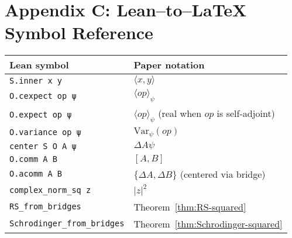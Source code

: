 \documentclass[11pt]{article}
\newcommand{\ip}[2]{\langle #1, #2 \rangle}
\newcommand{\E}[1]{\langle #1 \rangle}
\newcommand{\comm}[2]{[#1, #2]}
\newcommand{\acomm}[2]{\{#1, #2\}} %
\newcommand{\absC}[1]{\left| #1 \right|}
\newcommand{\Var}{\mathrm{Var}}
\theoremstyle{plain}
\theoremstyle{definition}
\theoremstyle{remark}
\begin{document}
\section*{Appendix C: Lean--to--LaTeX Symbol Reference}

\begin{center}
\begin{tabular}{ll}
\toprule
\textbf{Lean symbol} & \textbf{Paper notation} \\
\midrule
\verb|S.inner x y| & $\ip{x}{y}$ \\
\verb|O.cexpect op ψ| & $\E{op}_\psi$ \\
\verb|O.expect op ψ| & $\E{op}_\psi$ (real when $op$ is self-adjoint) \\
\verb|O.variance op ψ| & $\Var_\psi(op)$ \\
\verb|center S O A ψ| & $\Delta A\psi$ \\
\verb|O.comm A B| & $\comm{A}{B}$ \\
\verb|O.acomm A B| & $\acomm{\Delta A}{\Delta B}$ (centered via bridge) \\
\verb|complex_norm_sq z| & $\absC{z}^2$ \\
\verb|RS_from_bridges| & Theorem~\ref{thm:RS-squared} \\
\verb|Schrodinger_from_bridges| & Theorem~\ref{thm:Schrodinger-squared} \\
\bottomrule
\end{tabular}
\end{center}
\end{document}
